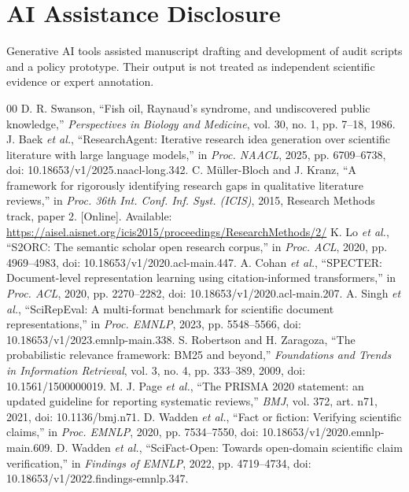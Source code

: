 \documentclass[conference,a4paper]{IEEEtran}
\begin{document}
\section*{AI Assistance Disclosure}
Generative AI tools assisted manuscript drafting and development of audit scripts and a policy prototype. Their output is not treated as independent scientific evidence or expert annotation.

\begin{thebibliography}{00}
 D. R. Swanson, ``Fish oil, Raynaud's syndrome, and undiscovered public knowledge,'' \emph{Perspectives in Biology and Medicine}, vol. 30, no. 1, pp. 7--18, 1986.
 J. Baek \emph{et al.}, ``ResearchAgent: Iterative research idea generation over scientific literature with large language models,'' in \emph{Proc. NAACL}, 2025, pp. 6709--6738, doi: 10.18653/v1/2025.naacl-long.342.
 C. M\"uller-Bloch and J. Kranz, ``A framework for rigorously identifying research gaps in qualitative literature reviews,'' in \emph{Proc. 36th Int. Conf. Inf. Syst. (ICIS)}, 2015, Research Methods track, paper 2. [Online]. Available: \url{https://aisel.aisnet.org/icis2015/proceedings/ResearchMethods/2/}
 K. Lo \emph{et al.}, ``S2ORC: The semantic scholar open research corpus,'' in \emph{Proc. ACL}, 2020, pp. 4969--4983, doi: 10.18653/v1/2020.acl-main.447.
 A. Cohan \emph{et al.}, ``SPECTER: Document-level representation learning using citation-informed transformers,'' in \emph{Proc. ACL}, 2020, pp. 2270--2282, doi: 10.18653/v1/2020.acl-main.207.
 A. Singh \emph{et al.}, ``SciRepEval: A multi-format benchmark for scientific document representations,'' in \emph{Proc. EMNLP}, 2023, pp. 5548--5566, doi: 10.18653/v1/2023.emnlp-main.338.
 S. Robertson and H. Zaragoza, ``The probabilistic relevance framework: BM25 and beyond,'' \emph{Foundations and Trends in Information Retrieval}, vol. 3, no. 4, pp. 333--389, 2009, doi: 10.1561/1500000019.
 M. J. Page \emph{et al.}, ``The PRISMA 2020 statement: an updated guideline for reporting systematic reviews,'' \emph{BMJ}, vol. 372, art. n71, 2021, doi: 10.1136/bmj.n71.
 D. Wadden \emph{et al.}, ``Fact or fiction: Verifying scientific claims,'' in \emph{Proc. EMNLP}, 2020, pp. 7534--7550, doi: 10.18653/v1/2020.emnlp-main.609.
 D. Wadden \emph{et al.}, ``SciFact-Open: Towards open-domain scientific claim verification,'' in \emph{Findings of EMNLP}, 2022, pp. 4719--4734, doi: 10.18653/v1/2022.findings-emnlp.347.

\end{thebibliography}
\end{document}
